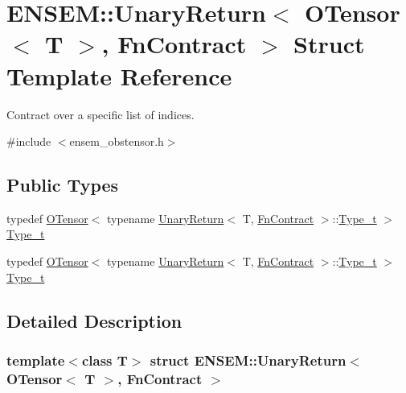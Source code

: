 \hypertarget{structENSEM_1_1UnaryReturn_3_01OTensor_3_01T_01_4_00_01FnContract_01_4}{}\section{E\+N\+S\+EM\+:\+:Unary\+Return$<$ O\+Tensor$<$ T $>$, Fn\+Contract $>$ Struct Template Reference}
\label{structENSEM_1_1UnaryReturn_3_01OTensor_3_01T_01_4_00_01FnContract_01_4}


Contract over a specific list of indices.  




{\ttfamily \#include $<$ensem\+\_\+obstensor.\+h$>$}

\subsection*{Public Types}
\begin{DoxyCompactItemize}
\item 
typedef \mbox{\hyperlink{classENSEM_1_1OTensor}{O\+Tensor}}$<$ typename \mbox{\hyperlink{structENSEM_1_1UnaryReturn}{Unary\+Return}}$<$ T, \mbox{\hyperlink{structENSEM_1_1FnContract}{Fn\+Contract}} $>$\+::\mbox{\hyperlink{structENSEM_1_1UnaryReturn_3_01OTensor_3_01T_01_4_00_01FnContract_01_4_a5b94783dc2f622ca8629f6318a2332ac}{Type\+\_\+t}} $>$ \mbox{\hyperlink{structENSEM_1_1UnaryReturn_3_01OTensor_3_01T_01_4_00_01FnContract_01_4_a5b94783dc2f622ca8629f6318a2332ac}{Type\+\_\+t}}
\item 
typedef \mbox{\hyperlink{classENSEM_1_1OTensor}{O\+Tensor}}$<$ typename \mbox{\hyperlink{structENSEM_1_1UnaryReturn}{Unary\+Return}}$<$ T, \mbox{\hyperlink{structENSEM_1_1FnContract}{Fn\+Contract}} $>$\+::\mbox{\hyperlink{structENSEM_1_1UnaryReturn_3_01OTensor_3_01T_01_4_00_01FnContract_01_4_a5b94783dc2f622ca8629f6318a2332ac}{Type\+\_\+t}} $>$ \mbox{\hyperlink{structENSEM_1_1UnaryReturn_3_01OTensor_3_01T_01_4_00_01FnContract_01_4_a5b94783dc2f622ca8629f6318a2332ac}{Type\+\_\+t}}
\end{DoxyCompactItemize}


\subsection{Detailed Description}
\subsubsection*{template$<$class T$>$\newline
struct E\+N\+S\+E\+M\+::\+Unary\+Return$<$ O\+Tensor$<$ T $>$, Fn\+Contract $>$}

